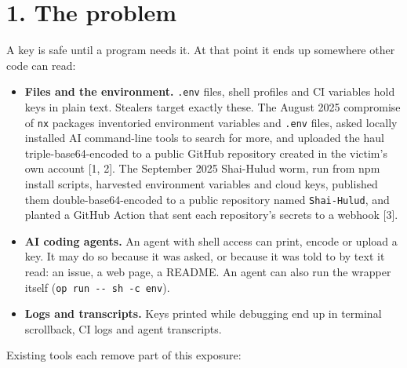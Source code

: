 \documentclass[
  11pt]{article}
\providecommand{\tightlist}{%
  \setlength{\itemsep}{0pt}\setlength{\parskip}{0pt}}
\begin{document}
\section*{1. The
problem}\label{the-problem}

A key is safe until a program needs it.
At that point it ends up somewhere other
code can read:

\begin{itemize}
\tightlist
\item
  \textbf{Files and the environment.}
  \texttt{.env} files, shell profiles
  and CI variables hold keys in plain
  text. Stealers target exactly these.
  The August 2025 compromise of
  \texttt{nx} packages inventoried
  environment variables and
  \texttt{.env} files, asked locally
  installed AI command-line tools to
  search for more, and uploaded the haul
  triple-base64-encoded to a public
  GitHub repository created in the
  victim's own account {[}1, 2{]}. The
  September 2025 Shai-Hulud worm, run
  from npm install scripts, harvested
  environment variables and cloud keys,
  published them double-base64-encoded
  to a public repository named
  \texttt{Shai-Hulud}, and planted a
  GitHub Action that sent each
  repository's secrets to a webhook
  {[}3{]}.
\item
  \textbf{AI coding agents.} An agent
  with shell access can print, encode or
  upload a key. It may do so because it
  was asked, or because it was told to
  by text it read: an issue, a web page,
  a README. An agent can also run the
  wrapper itself
  (\texttt{op\ run\ -\/-\ sh\ -c\ \textquotesingle{}env\textquotesingle{}}).
\item
  \textbf{Logs and transcripts.} Keys
  printed while debugging end up in
  terminal scrollback, CI logs and agent
  transcripts.
\end{itemize}

Existing tools each remove part of this
exposure:
\end{document}
